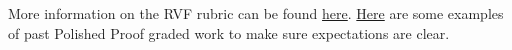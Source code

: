\documentclass{article}
\theoremstyle{definition}
\begin{document}
    More information on the RVF rubric can be found 
    \href{https://drive.google.com/file/d/1P0OBjw-GkX64uCpYcqYmXARapf9MwaiI/view?usp=sharing}{here}. 
    \href{https://drive.google.com/file/d/1KAFQ7GBFpfUkyTBRZ30h5o6nXWwYDSML/view?usp=sharing}{Here} 
    are some examples of past Polished Proof graded work to make sure expectations are clear. 
	
\end{document}
